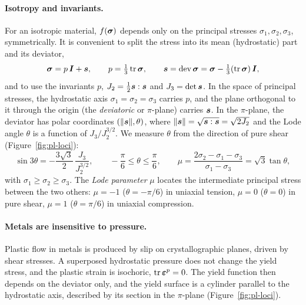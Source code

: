 \paragraph{Isotropy and invariants.}
%
For an isotropic material, $f(\bm{\sigma})$ depends only on the principal stresses
$\sigma_1,\sigma_2,\sigma_3$, symmetrically. It is convenient to split the
stress into its mean (hydrostatic) part and its deviator,
\[
  \bm{\sigma}=p\,\bm{I}+\bm{s},\qquad p=\tfrac13\operatorname{tr}\bm{\sigma},\qquad
  \bm{s}=\operatorname{dev}\bm{\sigma}=\bm{\sigma}-\tfrac13(\operatorname{tr}\bm{\sigma})\,\bm{I},
\]
and to use the invariants $p$, $J_2=\tfrac12\bm{s}:\bm{s}$ and
$J_3=\det\bm{s}$. In the space of principal stresses, the hydrostatic axis
$\sigma_1=\sigma_2=\sigma_3$ carries $p$, and the plane orthogonal to it
through the origin (the \emph{deviatoric} or $\pi$-plane) carries $\bm{s}$.
In the $\pi$-plane, the deviator has polar coordinates $(\lVert \bm{s}\rVert,\theta)$,
where $\lVert \bm{s}\rVert=\sqrt{\bm{s}:\bm{s}}=\sqrt{2J_2}$ and the Lode
angle $\theta$ is a function of $J_3/J_2^{3/2}$. We measure $\theta$ from the
direction of pure shear (Figure~\ref{fig:pl-loci}):
\begin{equation}\label{eq:pl-lode}
  \sin3\theta=-\frac{3\sqrt3}{2}\,\frac{J_3}{J_2^{3/2}},\qquad
  -\frac\pi6\le\theta\le\frac\pi6,\qquad
  \mu=\frac{2\sigma_2-\sigma_1-\sigma_3}{\sigma_1-\sigma_3}=\sqrt3\tan\theta ,
\end{equation}
with $\sigma_1\ge\sigma_2\ge\sigma_3$. The \emph{Lode parameter} $\mu$ locates
the intermediate principal stress between the two others: $\mu=-1$
($\theta=-\pi/6$) in uniaxial tension, $\mu=0$ ($\theta=0$) in pure shear,
$\mu=1$ ($\theta=\pi/6$) in uniaxial compression.

\paragraph{Metals are insensitive to pressure.}
%
Plastic flow in metals is
produced by slip on crystallographic planes, driven by shear stresses. A
superposed hydrostatic pressure does not change the yield stress, and the
plastic strain is isochoric, $\operatorname{tr}\bm{\varepsilon}^{p}=0$. The yield function then depends
on the deviator only, and the yield surface is a cylinder parallel to the
hydrostatic axis, described by its section in the $\pi$-plane
(Figure~\ref{fig:pl-loci}).

